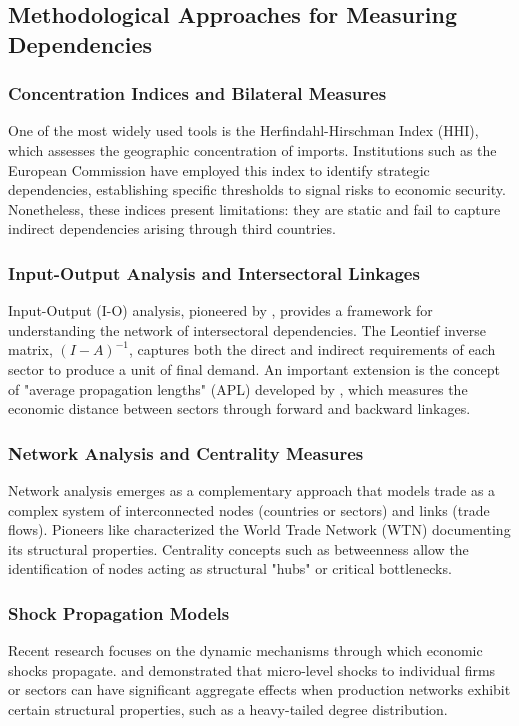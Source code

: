 \documentclass[final,1p,times,authoryear]{elsarticle}
\begin{document}
\subsection{Methodological Approaches for Measuring Dependencies}
\subsubsection{Concentration Indices and Bilateral Measures}
One of the most widely used tools is the Herfindahl-Hirschman Index (HHI), which assesses the geographic concentration of imports. Institutions such as the European Commission have employed this index to identify strategic dependencies, establishing specific thresholds to signal risks to economic security. Nonetheless, these indices present limitations: they are static and fail to capture indirect dependencies arising through third countries.

\subsubsection{Input-Output Analysis and Intersectoral Linkages}
Input-Output (I-O) analysis, pioneered by \cite{Leontief1951}, provides a framework for understanding the network of intersectoral dependencies. The Leontief inverse matrix, $(I - A)^{-1}$, captures both the direct and indirect requirements of each sector to produce a unit of final demand. An important extension is the concept of "average propagation lengths" (APL) developed by \cite{Dietzenbacher2005}, which measures the economic distance between sectors through forward and backward linkages.

\subsubsection{Network Analysis and Centrality Measures}
Network analysis emerges as a complementary approach that models trade as a complex system of interconnected nodes (countries or sectors) and links (trade flows). Pioneers like \cite{Fagiolo2010} characterized the World Trade Network (WTN) documenting its structural properties. Centrality concepts such as betweenness allow the identification of nodes acting as structural "hubs" or critical bottlenecks.

\subsubsection{Shock Propagation Models}
Recent research focuses on the dynamic mechanisms through which economic shocks propagate. \cite{Acemoglu2012} and \cite{Carvalho2013} demonstrated that micro-level shocks to individual firms or sectors can have significant aggregate effects when production networks exhibit certain structural properties, such as a heavy-tailed degree distribution.
\end{document}
